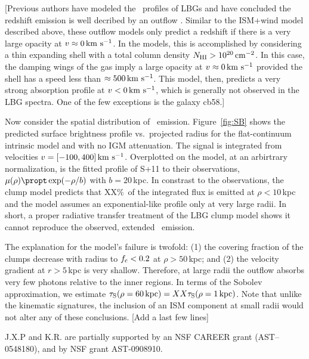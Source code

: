 \documentclass[12pt,preprint]{aastex}
\begin{document}
[Previous authors have modeled the \lya\ profiles of LBGs and have
concluded the redshift emission is well decribed by an outflow
\citep[e.g.][]{verhomme}.  Similar to the
ISM+wind model described above, these outflow models only predict a
redshift if there is a very large opacity at $v \approx 0\, {\rm km~s^{-1}}$.  In
the \cite{verhomme} models, this is accomplished by considering a
thin expanding shell with a total  column density $N_{\rm HI} > 10^{20}
\, {\rm cm^{-2}}$.  In this case, the damping wings of the gas imply a large
opacity at $v \approx 0 \, {\rm km~s^{-1}}$ provided the shell has a speed less
than $\approx 500 \, {\rm km~s^{-1}}$.  This model, then, predicts a very strong
absorption profile at $v < 0 \, {\rm km~s^{-1}}$, which is generally not observed
in the LBG spectra.  One of the few exceptions is the galaxy cb58.]

Now consider the spatial distribution of \lya\ emission.
Figure~\ref{fig:SB} shows the predicted surface brightness profile
vs.\ projected radius for the flat-continuum intrinsic model and with
no IGM attenuation.  The signal is integrated from velocities $v =
[-100,400]\, {\rm km~s^{-1}}$. Overplotted on the model, at an arbirtrary
normalization, is the fitted profile of S+11 to their observations,
$\mu(\rho) \propt \exp(-\rho/b)$ with $b=20$\,kpc.  In constrast to
the observations, the clump model predicts that XX\%\ of the
integrated flux is emitted at $\rho < 10$\,kpc and the model assumes
an exponential-like profile only at very large radii.  In short, a
proper radiative transfer treatment of the LBG clump model shows it
cannot reproduce the observed, extended \lya\ emission.  

The explanation for the model's failure is twofold:  
(1) the covering fraction of the clumps decrease with radius to
$f_{\rm c} < 0.2$ at $\rho > 50$\,kpc; and
(2) the velocity gradient at $r>5$\,kpc is very shallow.  Therefore,
at large radii the outflow absorbs very few photons relative to the
inner regions.  In terms of the Sobolev approximation, we estimate
$\tau_{\rm S}(\rho = 60 \, {\rm kpc}) = XX \tau_{\rm S}(\rho=1\, {\rm
  kpc})$.  
Note that unlike the kinematic signatures, the inclusion of an ISM
component at small radii would not alter any of these conclusions.
[Add a last few lines]



\acknowledgments

J.X.P and K.R. are partially supported
by an NSF CAREER grant (AST--0548180), and 
by NSF grant AST-0908910.

\clearpage
\end{document}
